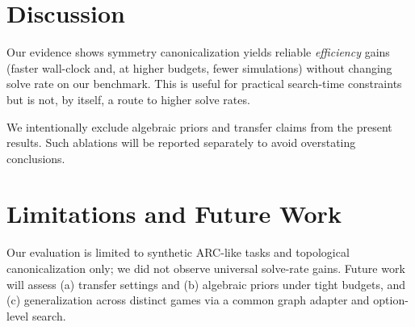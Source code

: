 \documentclass{article}
\begin{document}
\section{Discussion}
Our evidence shows symmetry canonicalization yields reliable \emph{efficiency} gains (faster wall-clock and, at higher budgets, fewer simulations) without changing solve rate on our benchmark. This is useful for practical search-time constraints but is not, by itself, a route to higher solve rates.

We intentionally exclude algebraic priors and transfer claims from the present results. Such ablations will be reported separately to avoid overstating conclusions.

\section{Limitations and Future Work}
Our evaluation is limited to synthetic ARC-like tasks and topological canonicalization only; we did not observe universal solve-rate gains. Future work will assess (a) transfer settings and (b) algebraic priors under tight budgets, and (c) generalization across distinct games via a common graph adapter and option-level search.
\end{document}
